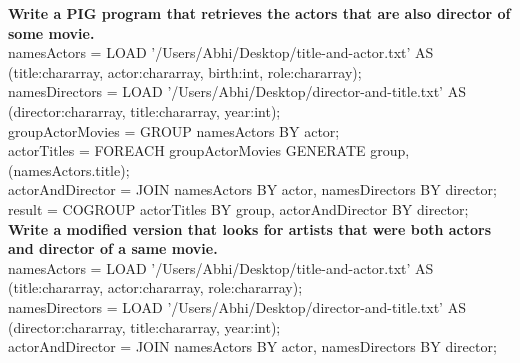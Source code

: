 \documentclass[Piglatin.tex]{subfiles}
\begin{document}
\textbf{Write a PIG program that retrieves the actors that are also director of some movie.} \\
namesActors = LOAD '/Users/Abhi/Desktop/title-and-actor.txt' AS (title:chararray, actor:chararray, birth:int, role:chararray); \\
namesDirectors = LOAD '/Users/Abhi/Desktop/director-and-title.txt' AS (director:chararray, title:chararray, year:int); \\
groupActorMovies = GROUP namesActors BY actor; \\
actorTitles = FOREACH groupActorMovies GENERATE group, (namesActors.title); \\
actorAndDirector = JOIN namesActors BY actor, namesDirectors BY director; \\
result = COGROUP actorTitles BY group, actorAndDirector BY director; \\

\textbf{Write a modified version that looks for artists that were both actors and director of a same movie.} \\
namesActors = LOAD '/Users/Abhi/Desktop/title-and-actor.txt' AS (title:chararray, actor:chararray, role:chararray); \\
namesDirectors = LOAD '/Users/Abhi/Desktop/director-and-title.txt' AS (director:chararray, title:chararray, year:int); \\
actorAndDirector = JOIN namesActors BY actor, namesDirectors BY director;
\end{document}
